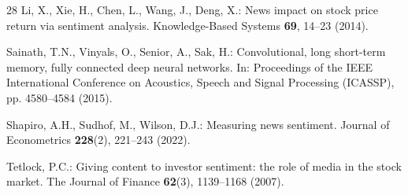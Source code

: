 \documentclass[pdflatex,sn-mathphys-num]{sn-jnl}%
\theoremstyle{thmstyleone}%
\theoremstyle{thmstyletwo}%
\theoremstyle{thmstylethree}%
\begin{document}
\begin{thebibliography}{28}
Li, X., Xie, H., Chen, L., Wang, J., Deng, X.: News impact on stock price return via sentiment analysis. Knowledge-Based Systems \textbf{69}, 14--23 (2014).

Sainath, T.N., Vinyals, O., Senior, A., Sak, H.: Convolutional, long short-term memory, fully connected deep neural networks. In: Proceedings of the IEEE International Conference on Acoustics, Speech and Signal Processing (ICASSP), pp. 4580--4584 (2015).

Shapiro, A.H., Sudhof, M., Wilson, D.J.: Measuring news sentiment. Journal of Econometrics \textbf{228}(2), 221--243 (2022).

Tetlock, P.C.: Giving content to investor sentiment: the role of media in the stock market. The Journal of Finance \textbf{62}(3), 1139--1168 (2007).

\end{thebibliography}
\end{document}
